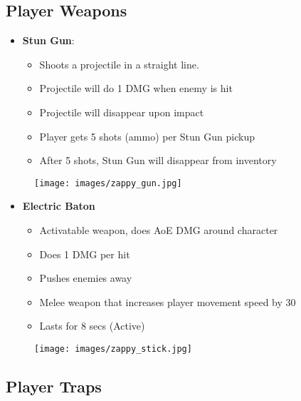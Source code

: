 \documentclass[10pt]{report}
\begin{document}
\subsection{Player Weapons}

\begin{itemize}
    \item \textbf{Stun Gun}:
    \begin{itemize}
        \item Shoots a projectile in a straight line.
        \item Projectile will do 1 DMG when enemy is hit 
        \item Projectile will disappear upon impact
        \item Player gets 5 shots (ammo) per Stun Gun pickup
        \item After 5 shots, Stun Gun will disappear from inventory
    \end{itemize}
\end{itemize}

\begin{figure}[H]
    \centering
    \texttt{[image: images/zappy\_gun.jpg]}
    \caption{}
\end{figure}

\begin{itemize}
    \item \textbf{Electric Baton}
    \begin{itemize}
        \item Activatable weapon, does AoE DMG around character
        \item Does 1 DMG per hit
        \item Pushes enemies away
        \item Melee weapon that increases player movement speed by 30%
        \item Lasts for 8 secs (Active)
    \end{itemize}
\end{itemize}

\begin{figure}[H]
    \centering
    \texttt{[image: images/zappy\_stick.jpg]}
    \caption{}
\end{figure}
    
\subsection{Player Traps}
\end{document}
